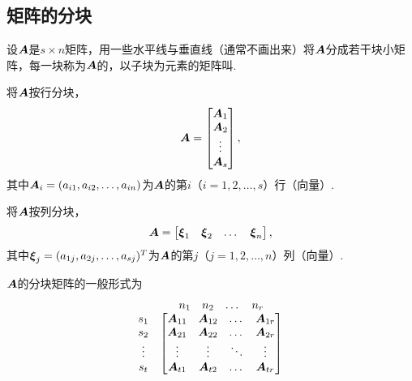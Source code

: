 \subsection{矩阵的分块}
\begin{definition}
设\(\boldsymbol{A}\)是\(s \times n\)矩阵，用一些水平线与垂直线（通常不画出来）将\(\boldsymbol{A}\)分成若干块小矩阵，每一块称为\(\boldsymbol{A}\)的，以子块为元素的矩阵叫.

将\(\boldsymbol{A}\)按行分块，\[
\boldsymbol{A}=\begin{bmatrix} \boldsymbol{A}_1 \\ \boldsymbol{A}_2 \\ \vdots \\ \boldsymbol{A}_s \end{bmatrix},
\]其中\(\boldsymbol{A}_i=(a_{i1},a_{i2},\dotsc,a_{in})\)为\(\boldsymbol{A}\)的第\(i\)（\(i=1,2,\dotsc,s\)）行（向量）.

将\(\boldsymbol{A}\)按列分块，\[
\boldsymbol{A}=\begin{bmatrix} \boldsymbol{\xi}_1 & \boldsymbol{\xi}_2 & \dots & \boldsymbol{\xi}_n \end{bmatrix},
\]其中\(\boldsymbol{\xi}_j=(a_{1j},a_{2j},\dotsc,a_{sj})^T\)为\(\boldsymbol{A}\)的第\(j\)（\(j=1,2,\dotsc,n\)）列（向量）.

\(\boldsymbol{A}\)的分块矩阵的一般形式为\[
\begin{matrix}
& \begin{matrix} n_1 & n_2 & \dots & n_r \end{matrix} \\
\begin{matrix} s_1 \\ s_2 \\ \vdots \\ s_t \end{matrix} & \begin{bmatrix}
\boldsymbol{A}_{11} & \boldsymbol{A}_{12} & \dots & \boldsymbol{A}_{1r} \\
\boldsymbol{A}_{21} & \boldsymbol{A}_{22} & \dots & \boldsymbol{A}_{2r} \\
\vdots & \vdots & \ddots & \vdots \\
\boldsymbol{A}_{t1} & \boldsymbol{A}_{t2} & \dots & \boldsymbol{A}_{tr}
\end{bmatrix}
\end{matrix}
\]
\end{definition}

